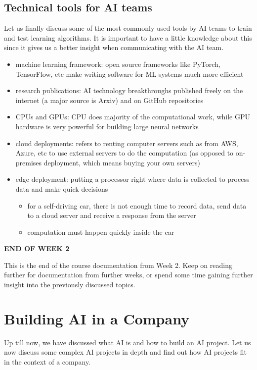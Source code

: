 \documentclass{article}[a4paper,12pt]
\theoremstyle{definition}
\begin{document}
\subsection{Technical tools for AI teams}
Let us finally discuss some of the most commonly used tools by AI teams to train and test learning algorithms. It is important to have a little knowledge about this since it gives us a better insight when communicating with the AI team.
\begin{itemize}
	\item machine learning framework: open source frameworks like PyTorch, TensorFlow, etc make writing software for ML systems much more efficient
	\item research publications: AI technology breakthroughs published freely on the internet (a major source is Arxiv) and on GitHub repositories
	\item CPUs and GPUs: CPU does majority of the computational work, while GPU hardware is very powerful for building large neural networks
	\item cloud deployments: refers to renting computer servers such as from AWS, Azure, etc to use external servers to do the computation (as opposed to on-premises deployment, which means buying your own servers)
	\item edge deployment: putting a processor right where data is collected to process data and make quick decisions
	\begin{itemize}
		\item for a self-driving car, there is not enough time to record data, send data to a cloud server and receive a response from the server
		\item computation must happen quickly inside the car
	\end{itemize}
\end{itemize}
\hrulefill
\begin{center}
\textbf{END OF WEEK 2}
\end{center}
This is the end of the course documentation from Week 2. Keep on reading further for documentation from further weeks, or spend some time gaining further insight into the previously discussed topics.

\hrulefill
\pagebreak
\section{Building AI in a Company}
Up till now, we have discussed what AI is and how to build an AI project. Let us now discuss some complex AI projects in depth and find out how AI projects fit in the context of a company.
\end{document}
